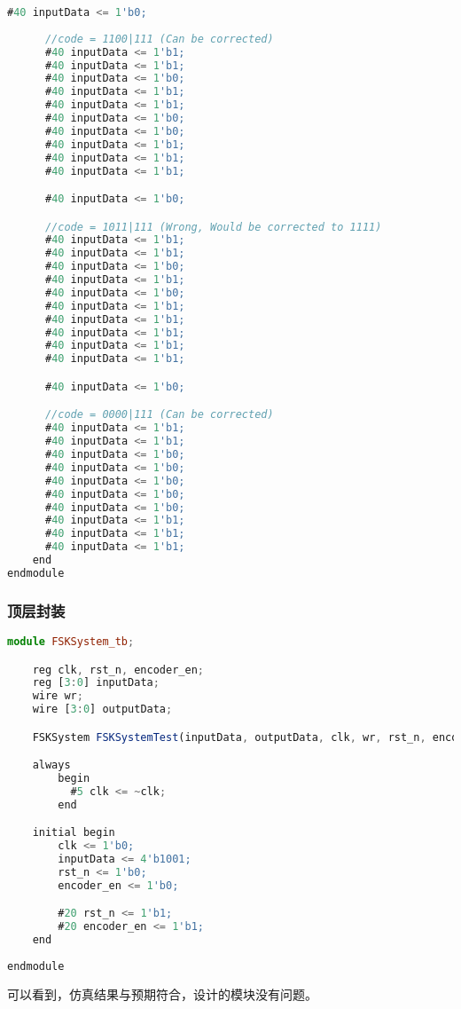 \documentclass{progartcn}
\begin{document}
\begin{lstlisting}[language=TypeScript,caption={decode\_tb.v}]
      #40 inputData <= 1'b0;
      
      //code = 1100|111 (Can be corrected)
      #40 inputData <= 1'b1;
      #40 inputData <= 1'b1;
      #40 inputData <= 1'b0;
      #40 inputData <= 1'b1;
      #40 inputData <= 1'b1;
      #40 inputData <= 1'b0;
      #40 inputData <= 1'b0;
      #40 inputData <= 1'b1;
      #40 inputData <= 1'b1;
      #40 inputData <= 1'b1;

      #40 inputData <= 1'b0;

      //code = 1011|111 (Wrong, Would be corrected to 1111)
      #40 inputData <= 1'b1;
      #40 inputData <= 1'b1;
      #40 inputData <= 1'b0;
      #40 inputData <= 1'b1;
      #40 inputData <= 1'b0;
      #40 inputData <= 1'b1;
      #40 inputData <= 1'b1;
      #40 inputData <= 1'b1;
      #40 inputData <= 1'b1;
      #40 inputData <= 1'b1;

      #40 inputData <= 1'b0;

      //code = 0000|111 (Can be corrected)
      #40 inputData <= 1'b1;
      #40 inputData <= 1'b1;
      #40 inputData <= 1'b0;
      #40 inputData <= 1'b0;
      #40 inputData <= 1'b0;
      #40 inputData <= 1'b0;
      #40 inputData <= 1'b0;
      #40 inputData <= 1'b1;
      #40 inputData <= 1'b1;
      #40 inputData <= 1'b1;
    end
endmodule
\end{lstlisting}

\subsubsection{顶层封装}
\begin{lstlisting}[language=TypeScript,caption={FSKSystem\_tb.v}]
module FSKSystem_tb;

    reg clk, rst_n, encoder_en;
    reg [3:0] inputData;
    wire wr;
    wire [3:0] outputData;

    FSKSystem FSKSystemTest(inputData, outputData, clk, wr, rst_n, encoder_en);

    always
        begin
          #5 clk <= ~clk;
        end

    initial begin
        clk <= 1'b0;
        inputData <= 4'b1001; 
        rst_n <= 1'b0;
        encoder_en <= 1'b0;

        #20 rst_n <= 1'b1;
        #20 encoder_en <= 1'b1;
    end
    
endmodule
\end{lstlisting}

可以看到，仿真结果与预期符合，设计的模块没有问题。
\end{document}
